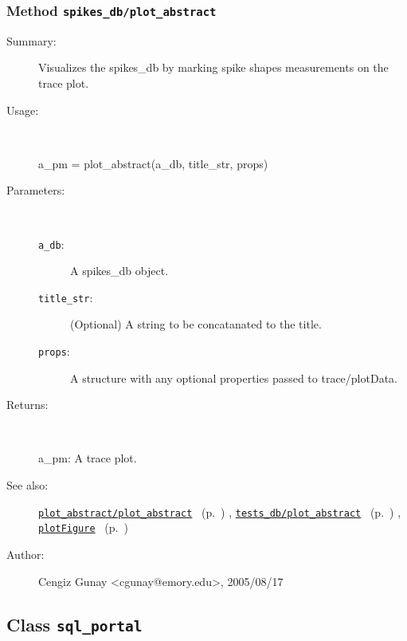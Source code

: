 \subsubsection[Method \texttt{plot\_abstract}]{Method \texttt{spikes\_db/plot\_abstract}}%
%
\label{ref_spikes_db__plot_abstract}%
\hypertarget{ref_spikes_db__plot_abstract}{}%
\begin{description}
\item[Summary:]Visualizes the spikes\_db by marking spike shapes measurements on the trace plot.
%
\item[Usage:]~%
\begin{lyxcode}%
a\_pm = plot\_abstract(a\_db, title\_str, props)
%
\end{lyxcode}%
%
%
\item[Parameters:]~
\begin{description}%
\item[\texttt{a\_db}:]
 A spikes\_db object.
\item[\texttt{title\_str}:]
 (Optional) A string to be concatanated to the title.
\item[\texttt{props}:]
 A structure with any optional properties passed to trace/plotData.
\end{description}%
%
\item[Returns:
]~

	a\_pm: A trace plot.
%
%
\item[See also:]%
\hyperlink{ref_plot_abstract__plot_abstract}{\texttt{plot\_abstract/plot\_abstract}}%
\ (p.~\pageref{ref_plot_abstract__plot_abstract})%
%
, \hyperlink{ref_tests_db__plot_abstract}{\texttt{tests\_db/plot\_abstract}}%
\ (p.~\pageref{ref_tests_db__plot_abstract})%
%
, \hyperlink{ref_plotFigure}{\texttt{plotFigure}}%
\ (p.~\pageref{ref_plotFigure})%
%
%
\item[Author:]%
Cengiz Gunay <cgunay@emory.edu>, 2005/08/17
%
\end{description}
\methodline%
\subsection{Class \texttt{sql\_portal}}%
%
\label{ref_sql_portal}%
\hypertarget{ref_sql_portal}{}%
